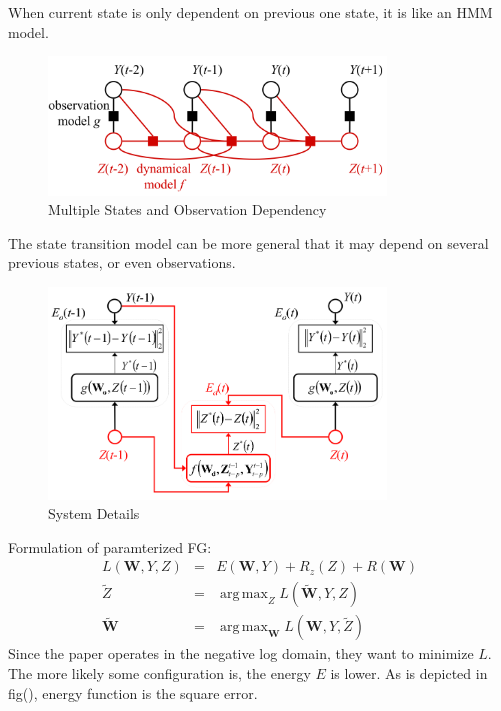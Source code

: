 \documentclass[11pt,a4paper]{article}
\DeclareMathOperator*{\argmax}{arg\,max}
\begin{document}
When current state is only dependent on previous one state, it
is like an HMM model. 

\begin{figure}[htb]
\centering
	\includegraphics[width=0.8\textwidth]{fig/mirowski2009-framework.png}
	\caption{Multiple States and Observation Dependency}
\end{figure}

The state transition model can be more general that it may depend
on several previous states, or even observations. 

\begin{figure}[htb]
\centering
	\includegraphics[width=0.8\textwidth]{fig/mirowski2009-detail.png}
	\caption{System Details}
\end{figure}

Formulation of paramterized FG:
\begin{eqnarray}
	L(\mathbf{W}, Y, Z) &=& E(\mathbf{W}, Y) + R_z(Z) + R(\mathbf{W}) \\
	\tilde{Z} &=& \argmax_{Z} L(\tilde{\mathbf{W}}, Y, Z) \label{eq:dfg-e}\\
	\tilde{\mathbf{W}} &=& \argmax_{\mathbf{W}} L(\mathbf{W}, Y, \tilde{Z})
	\label{eq:dfg-m}
\end{eqnarray}
Since the paper operates in the negative log domain, they want to minimize
$L$. The more likely some configuration is, the energy $E$ is lower. As is 
depicted in fig(), energy function is the square error. 
\end{document}
